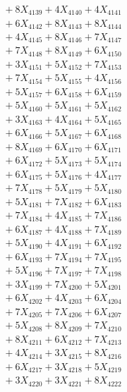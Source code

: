 \documentclass[a4paper,10pt]{article}
\begin{document}
{\begin{align}
&\;  + 8 X_{4139} + 4 X_{4140} + 4 X_{4141} \\[0.3ex]
&\;  + 6 X_{4142} + 8 X_{4143} + 8 X_{4144} \\[0.3ex]
&\;  + 4 X_{4145} + 8 X_{4146} + 7 X_{4147} \\[0.3ex]
&\;  + 7 X_{4148} + 8 X_{4149} + 6 X_{4150} \\[0.5ex]\allowbreak
&\;  + 3 X_{4151} + 5 X_{4152} + 7 X_{4153} \\[0.3ex]
&\;  + 7 X_{4154} + 5 X_{4155} + 4 X_{4156} \\[0.3ex]
&\;  + 5 X_{4157} + 6 X_{4158} + 6 X_{4159} \\[0.3ex]
&\;  + 5 X_{4160} + 5 X_{4161} + 5 X_{4162} \\[0.3ex]
&\;  + 3 X_{4163} + 4 X_{4164} + 5 X_{4165} \\[0.3ex]
&\;  + 6 X_{4166} + 5 X_{4167} + 6 X_{4168} \\[0.3ex]
&\;  + 8 X_{4169} + 6 X_{4170} + 6 X_{4171} \\[0.3ex]
&\;  + 6 X_{4172} + 5 X_{4173} + 5 X_{4174} \\[0.3ex]
&\;  + 6 X_{4175} + 5 X_{4176} + 4 X_{4177} \\[0.3ex]
&\;  + 7 X_{4178} + 5 X_{4179} + 5 X_{4180} \\[0.5ex]\allowbreak
&\;  + 5 X_{4181} + 7 X_{4182} + 6 X_{4183} \\[0.3ex]
&\;  + 7 X_{4184} + 4 X_{4185} + 7 X_{4186} \\[0.3ex]
&\;  + 6 X_{4187} + 4 X_{4188} + 7 X_{4189} \\[0.3ex]
&\;  + 5 X_{4190} + 4 X_{4191} + 6 X_{4192} \\[0.3ex]
&\;  + 6 X_{4193} + 7 X_{4194} + 7 X_{4195} \\[0.3ex]
&\;  + 5 X_{4196} + 7 X_{4197} + 7 X_{4198} \\[0.3ex]
&\;  + 3 X_{4199} + 7 X_{4200} + 5 X_{4201} \\[0.3ex]
&\;  + 6 X_{4202} + 4 X_{4203} + 6 X_{4204} \\[0.3ex]
&\;  + 7 X_{4205} + 7 X_{4206} + 6 X_{4207} \\[0.3ex]
&\;  + 5 X_{4208} + 8 X_{4209} + 7 X_{4210} \\[0.5ex]\allowbreak
&\;  + 8 X_{4211} + 6 X_{4212} + 7 X_{4213} \\[0.3ex]
&\;  + 4 X_{4214} + 3 X_{4215} + 8 X_{4216} \\[0.3ex]
&\;  + 6 X_{4217} + 3 X_{4218} + 5 X_{4219} \\[0.3ex]
&\;  + 3 X_{4220} + 3 X_{4221} + 8 X_{4222} \\[0.3ex]

\end{align}}
\end{document}
